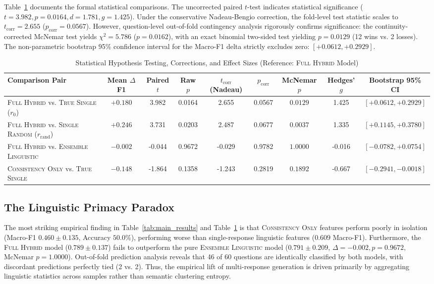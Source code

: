 \documentclass[conference]{IEEEtran}
\begin{document}
Table~\ref{tab:stat_tests} documents the formal statistical comparisons. The uncorrected paired $t$-test indicates statistical significance ($t=3.982, p=0.0164, d=1.781, g=1.425$). Under the conservative Nadeau-Bengio correction, the fold-level test statistic scales to $t_{\text{corr}} = 2.655$ ($p_{\text{corr}} = 0.0567$). However, question-level out-of-fold contingency analysis rigorously confirms significance: the continuity-corrected McNemar test yields $\chi^2 = 5.786$ ($p = 0.0162$), with an exact binomial two-sided test yielding $p = 0.0129$ (12 wins vs. 2 losses). The non-parametric bootstrap 95\% confidence interval for the Macro-F1 delta strictly excludes zero: $[+0.0612, +0.2929]$.

\begin{table}[t]
\caption{Statistical Hypothesis Testing, Corrections, and Effect Sizes (Reference: \textsc{Full Hybrid} Model)}
\label{tab:stat_tests}
\centering
\begin{tabularx}{\textwidth}{lcccccccc}
\toprule
\textbf{Comparison Pair} & \textbf{Mean $\Delta$ F1} & \textbf{Paired $t$} & \textbf{Raw $p$} & \textbf{$t_{\text{corr}}$ (Nadeau)} & \textbf{$p_{\text{corr}}$} & \textbf{McNemar $p$} & \textbf{Hedges' $g$} & \textbf{Bootstrap 95\% CI} \\
\midrule
\textsc{Full Hybrid} vs. \textsc{True Single} ($r_0$) & $\mathbf{+0.180}$ & 3.982 & 0.0164 & 2.655 & 0.0567 & $\mathbf{0.0129}$ & 1.425 & $[+0.0612, +0.2929]$ \\
\textsc{Full Hybrid} vs. \textsc{Single Random} ($r_{\text{rand}}$) & $\mathbf{+0.246}$ & 3.731 & 0.0203 & 2.487 & 0.0677 & $\mathbf{0.0037}$ & 1.335 & $[+0.1145, +0.3780]$ \\
\textsc{Full Hybrid} vs. \textsc{Ensemble Linguistic} & $-0.002$ & -0.044 & 0.9672 & -0.029 & 0.9782 & $1.0000$ & -0.016 & $[-0.0782, +0.0754]$ \\
\textsc{Consistency Only} vs. \textsc{True Single} & $-0.148$ & -1.864 & 0.1358 & -1.243 & 0.2819 & $0.1892$ & -0.667 & $[-0.2941, -0.0018]$ \\
\bottomrule
\end{tabularx}
\end{table}

\subsection{The Linguistic Primacy Paradox}
The most striking empirical finding in Table~\ref{tab:main_results} and Table~\ref{tab:stat_tests} is that \textsc{Consistency Only} features perform poorly in isolation (Macro-F1 $0.460 \pm 0.135$, Accuracy $50.0\%$), performing worse than single-response linguistic features ($0.609$ Macro-F1). Furthermore, the \textsc{Full Hybrid} model ($0.789 \pm 0.137$) fails to outperform the pure \textsc{Ensemble Linguistic} model ($0.791 \pm 0.209$, $\Delta = -0.002, p = 0.9672$, McNemar $p = 1.0000$). Out-of-fold prediction analysis reveals that 46 of 60 questions are identically classified by both models, with discordant predictions perfectly tied (2 vs. 2). Thus, the empirical lift of multi-response generation is driven primarily by aggregating linguistic statistics across samples rather than semantic clustering entropy.
\end{document}
